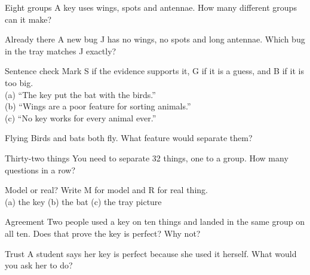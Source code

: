 \clearpage

\begin{puzzle}{Eight groups}
A key uses wings, spots and antennae. How many different groups can it make? \wline[1.6cm]
\end{puzzle}

\begin{puzzle}{Already there}
A new bug J has no wings, no spots and long antennae. Which bug in the tray matches J exactly? \wline[1.6cm]
\end{puzzle}

\begin{puzzle}{Sentence check}
Mark S if the evidence supports it, G if it is a guess, and B if it is too big.\\
(a) ``The key put the bat with the birds.'' \wline[1cm]\\
(b) ``Wings are a poor feature for sorting animals.'' \wline[1cm]\\
(c) ``No key works for every animal ever.'' \wline[1cm]
\end{puzzle}

\begin{puzzle}{Flying}
Birds and bats both fly. What feature would separate them? \wline[6cm]
\end{puzzle}

\clearpage

\begin{puzzle}{Thirty-two things}
You need to separate 32 things, one to a group. How many questions in a row? \wline[1.6cm]
\end{puzzle}

\begin{puzzle}{Model or real?}
Write M for model and R for real thing.\\
(a) the key \wline[1cm] \quad (b) the bat \wline[1cm] \quad (c) the tray picture \wline[1cm]
\end{puzzle}

\begin{puzzle}{Agreement}
Two people used a key on ten things and landed in the same group on all ten. Does that prove the key is perfect? \wline[2cm] Why not? \wline[4cm]
\end{puzzle}

\begin{puzzle}{Trust}
A student says her key is perfect because she used it herself. What would you ask her to do? \wline[6cm]
\end{puzzle}

\clearpage

